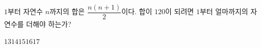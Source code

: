 $1$부터 자연수 $n$까지의 합은 $\dfrac{n(n+1)}{2}$이다. 합이 $120$이 되려면 $1$부터 얼마까지의 자연수를 더해야 하는가?
\begin{choices32}{$13$}{$14$}{$15$}{$16$}{$17$}\end{choices32}
